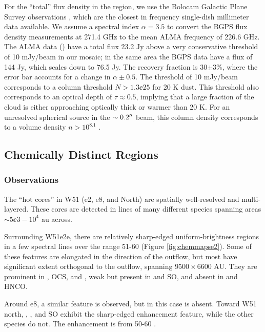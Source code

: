 \documentclass{aa}
\begin{document}
For the ``total'' flux density in the region, we use the Bolocam Galactic Plane
Survey observations \citep{Aguirre2011a,Ginsburg2013a}, which are the closest
in frequency single-dish millimeter data available.  We assume a spectral index
$\alpha=3.5$ to convert the BGPS flux density measurements at 271.4 GHz to the
mean ALMA frequency of 226.6 GHz.  The ALMA data () have a total flux 23.2 Jy above a very conservative
threshold of 10 mJy/beam in our
mosaic; in the same area the BGPS data have a flux of 144 Jy, which scales down to
76.5 Jy.  The recovery fraction is 30$\pm3$\%, where the error bar accounts
for a change in $\alpha\pm0.5$.  The threshold of 10 mJy/beam corresponds to a
column threshold $N>1.3\ee{25}$ \percc for 20 K dust. This threshold also
corresponds to an optical depth of $\tau\approx0.5$, implying that a large
fraction of the cloud is either approaching optically thick or warmer than 20
K.  For an unresolved spherical source in the $\sim0.2\mbox{$^{\prime\prime}$}$ beam, this
column density corresponds to a volume density $n>10^{8.1}$ \percc.


\subsection{Chemically Distinct Regions}
\label{sec:chemistrymaps}
\subsubsection{Observations}
The ``hot cores'' in W51 (e2, e8, and North) are spatially well-resolved and
multi-layered.  These cores are detected in lines of many different species
spanning areas $\sim5\ee{3}-10^4$ au across.

Surrounding W51e2e, there are relatively sharp-edged uniform-brightness regions
in a few spectral lines over the range 51-60 \kms (Figure
\ref{fig:chemmapse2}).  Some of these features are elongated in the direction
of the outflow, but most have significant extent orthogonal to the outflow,
spanning $9500\times6600$ AU.  They are prominent in \methanol, OCS, and
\dimethylether, weak but present in \formaldehyde and SO, and absent in
\cyanoacetylene and HNCO.

Around e8, a similar feature is observed, but in this case \dimethylether is absent.
Toward W51 north, \methanol, \formaldehyde, and SO exhibit the sharp-edged
enhancement feature, while the other species do not.  The enhancement is from
50-60 \kms.
\end{document}
